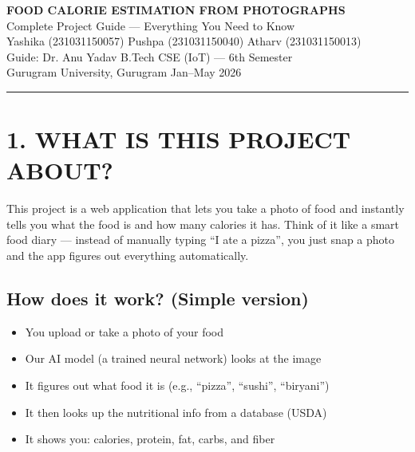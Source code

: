 \documentclass[11pt,a4paper]{article}
\begin{document}

\begin{center}
{\LARGE \textbf{FOOD CALORIE ESTIMATION FROM PHOTOGRAPHS}}\\[0.3cm]
{\large Complete Project Guide --- Everything You Need to Know}\\[0.3cm]
{\normalsize Yashika (231031150057) \textbar{} Pushpa (231031150040) \textbar{} Atharv (231031150013)}\\[0.15cm]
{\normalsize Guide: Dr. Anu Yadav \textbar{} B.Tech CSE (IoT) --- 6th Semester}\\[0.15cm]
{\normalsize Gurugram University, Gurugram \textbar{} Jan--May 2026}
\end{center}

\vspace{0.3cm}
\noindent\rule{\textwidth}{0.4pt}
\vspace{0.3cm}

\section{1. WHAT IS THIS PROJECT ABOUT?}

This project is a web application that lets you take a photo of food and instantly tells you what the food is and how many calories it has. Think of it like a smart food diary --- instead of manually typing ``I ate a pizza'', you just snap a photo and the app figures out everything automatically.

\subsection{How does it work? (Simple version)}
\begin{itemize}[leftmargin=1.5cm]
\item You upload or take a photo of your food
\item Our AI model (a trained neural network) looks at the image
\item It figures out what food it is (e.g., ``pizza'', ``sushi'', ``biryani'')
\item It then looks up the nutritional info from a database (USDA)
\item It shows you: calories, protein, fat, carbs, and fiber
\end{itemize}

\end{document}
